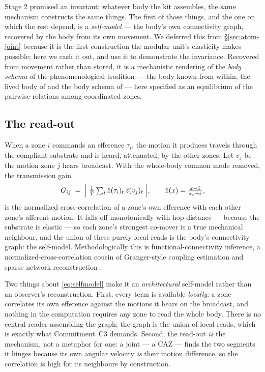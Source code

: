 \documentclass{article}
\begin{document}
Stage 2 promised an invariant: whatever body the kit assembles, the
same mechanism constructs the same things.  The first of those things,
and the one on which the rest depend, is a \emph{self-model} --- the
body's own connectivity graph, recovered by the body from its own
movement.  We deferred this from \S\ref{sec:atom-joint} because it is
the first construction the modular unit's elasticity makes possible; here we
cash it out, and use it to demonstrate the invariance.  Recovered from movement
rather than stored, it is a mechanistic rendering of the \emph{body schema} of the
phenomenological tradition --- the body known from within, the lived body of
\citet{Merleau-Ponty2013-vs} and the body schema of \citet{gallagher2005how} ---
here specified as an equilibrium of the pairwise relations among coordinated zones.

\subsection{The read-out}\label{sec:selfmodel-readout}

When a zone $i$ commands an efference $\tau_i$, the motion it produces
travels through the compliant substrate and is heard, attenuated, by
the other zones.  Let $v_j$ be the motion zone $j$ hears broadcast.
With the whole-body common mode removed, the transmission gain
\begin{equation}
G_{ij} \;=\; \Bigl|\;\tfrac{1}{T}\textstyle\sum_{t}
  \hat z(\tau_i)_t\,\hat z(v_j)_t\;\Bigr|,
\qquad
\hat z(x) = \frac{x-\bar x}{\sigma_x+\varepsilon},
\label{eq:selfmodel}
\end{equation}
is the normalized cross-correlation of a zone's own efference with each
other zone's afferent motion.  It falls off monotonically with
hop-distance --- because the substrate is elastic --- so each zone's
strongest co-mover is a true mechanical neighbour, and the union of
these purely local reads is the body's connectivity graph: the
self-model.  Methodologically this is functional-connectivity inference, a
normalized-cross-correlation cousin of Granger-style coupling estimation and
sparse network reconstruction \citep{Granger1969CausalRelations}.

Two things about \eqref{eq:selfmodel} make it an \emph{architectural}
self-model rather than an observer's reconstruction.  First, every term
is available \emph{locally}: a zone correlates its own efference against
the motions it hears on the broadcast, and nothing in the computation
requires any zone to read the whole body.  There is no central reader
assembling the graph; the graph is the union of local reads, which is
exactly what Commitment~C3 demands.  Second, the read-out \emph{is} the
mechanism, not a metaphor for one: a joint --- a CAZ --- finds the two
segments it hinges because its own angular velocity \emph{is} their
motion difference, so the correlation is high for its neighbours by
construction.
\end{document}
